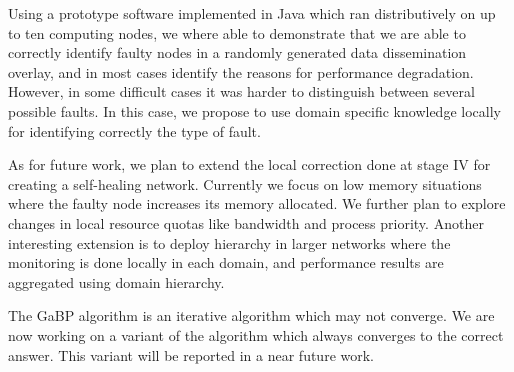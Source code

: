 \documentclass[times, 10pt,twocolumn]{article}
\begin{document}
Using a prototype software implemented in Java which ran distributively on up to ten computing nodes, we where able
to demonstrate that we are able to correctly identify faulty nodes in a randomly generated data dissemination overlay, and in most cases identify the reasons for performance degradation. However, in some difficult cases it was harder to
distinguish between several possible faults. In this case, we propose to use domain specific knowledge locally
for identifying correctly the type of fault.

As for future work, we plan to extend the local correction done at stage IV for creating a self-healing network.
Currently we focus on low memory situations where the faulty node increases its memory allocated.
We further plan to explore changes in local resource quotas like bandwidth and process priority. Another interesting
extension is to deploy hierarchy in larger networks where the monitoring is done locally in each domain, and performance results are aggregated using domain hierarchy.

The GaBP algorithm is an iterative algorithm which may not converge. We are now working on a variant of the algorithm
which always converges to the correct answer. This variant will be reported in a near future work.


\end{document}
